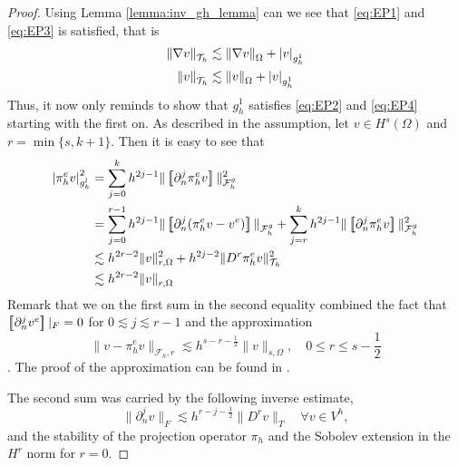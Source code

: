 \begin{proof}
    Using Lemma \ref{lemma:inv_gh_lemma} can we see that \eqref{eq:EP1} and \eqref{eq:EP3} is satisfied, that is \[
    \begin{split}
        \| \nabla v \|_{ \mathcal{T} _{h} }^{  } & \lesssim \| \nabla v \|_{ \Omega  }^{  }  + \left\lvert  v  \right\rvert _{g_{h}^{1}} \\
        \|  v \|_{ \mathcal{T} _{h} }^{  } & \lesssim \|  v \|_{ \Omega  }^{  }  + \left\lvert  v  \right\rvert _{g_{h}^{1}}
    \end{split}
    \]
    Thus, it now only reminds to show that $g_{h}^{1}$  satisfies \eqref{eq:EP2} and \eqref{eq:EP4} starting with the first on. As described in the assumption, let $v \in H^{s}( \Omega ) $ and $r = \min \{s, k+1\} $. Then it is easy to see that \[
        \begin{split}
        \abs{ \pi ^{e}_{h} v }_{g_{h}^{l}}^{2} & = \sum_{j=0}^{k} h^{2j-1} \| \jump{ \partial ^{j}_{n}\pi ^{e}_{h} v  }  \|_{\mathcal{F} _{h}^{g}  }^{2  } \\
        &= \sum_{j=0}^{r-1} h^{2j -1} \| \jump{ \partial ^{j}_{n} ( \pi _{h}^{e} v - v^{e}) }    \|_{\mathcal{F} _{h}^{g}  }^{  } +  \sum_{j=r}^{k} h^{2j-1} \| \jump{ \partial ^{j}_{n} \pi ^{e}_{h} v }   \|_{\mathcal{F} _{h}^{g}  }^{ 2 }    \\
        & \lesssim h^{2r- 2}\| v \|_{ r,\Omega  }^{ 2 } + h^{2j-2}\| D^{r} \pi ^{e}_{h} v \|_{ \mathcal{T} _{h} }^{ 2 }   \\
        & \lesssim h^{2r -2 } \| v \|_{ r,\Omega  }^{  }
        \end{split}
    \]
    Remark that we on the first sum in the second equality combined the fact that $\left[\!\!\left[  \partial _{n}^{j} v^{e}  \right]\!\!\right]| _{F} = 0 $ for $0\lesssim j \lesssim r-1$ and the approximation \[
    \| v-\pi _{h}^{e} v \|_{ \mathcal{F} _{h},r  }^{  } \lesssim h^{s-r -\frac{1}{2}} \| v \|_{ s,\Omega  }^{  }, \quad 0 \le r \le  s-\frac{1}{2}
\]. The proof of the approximation can be found in \cite[Chapter 2.41]{gurkan2019stabilized}.

The second sum was carried by the following inverse estimate, \[
\| \partial ^{j}_{n}v \|_{ F }^{  }  \lesssim h^{r - j - \frac{1}{2}} \| D^{r} v \|_{ T }^{  } \quad  \forall v \in V^{h},
\]
and the stability of the projection operator $\pi _{h}$ and the Sobolev extension in the $H^{r}$ norm for $r=0$.
\end{proof}


